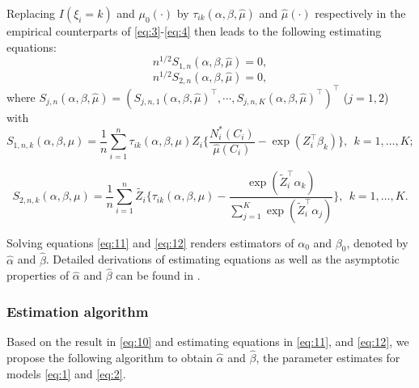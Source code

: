 Replacing \(I(\xi_i=k)\) and \(\mu_0(\cdot)\) by \(\tau_{ik}(\alpha, \beta, \hat\mu)\) and \(\hat\mu(\cdot)\) respectively in the empirical counterparts of \eqref{eq:3}-\eqref{eq:4} then leads to the following estimating equations:
\begin{equation} 
\label{eq:11}
n^{1/2} S_{1,n}(\alpha, \beta, \hat{\mu}) = 0,
\end{equation}
\begin{equation} 
\label{eq:12}
n^{1/2} S_{2,n}(\alpha, \beta, \hat{\mu}) = 0,
\end{equation}
where
\(S_{j,n} (\alpha, \beta, \hat{\mu}) = ( S_{j,n,1} (\alpha, \beta, \hat{\mu})^{\top}, \cdots , S_{j,n,K} (\alpha, \beta, \hat{\mu})^{\top} )^{\top}\)
(\(j = 1,2\))
with
\begin{equation}
S_{1,n,k}(\alpha, \beta, \mu) = \frac{1}{n}\sum _{i = 1} ^{n} \tau_{ik}(\alpha, \beta, \mu) Z_{i} \{ \frac{N_i ^{*} (C _{i})}{\hat\mu(C_{i})} - \exp(Z_{i} ^{\top} \beta_{k})\},\ \ k=1,\ldots, K;
\end{equation}

\begin{equation}
S_{2,n,k}(\alpha, \beta, \mu) = \frac{1}{n}\sum _{i = 1} ^{n}  \tilde{Z_{i}} \{ \tau_{ik}(\alpha, \beta, \mu) - \frac{\exp(\tilde{Z} _{i} ^{\top} \alpha _{k})}{\sum _{j = 1} ^{K} \exp(\tilde{Z} _{i} ^{\top} \alpha _{j})}\},\ \ k=1,\ldots, K.
\end{equation}

Solving equations \eqref{eq:11} and \eqref{eq:12} renders estimators of \(\alpha_0\) and \(\beta_0\), denoted by \(\hat\alpha\) and \(\hat\beta\). Detailed derivations of estimating equations as well as the asymptotic
properties of \(\hat\alpha\) and \(\hat\beta\) can be found in \citet{zhao2022semiparametric} .

\hypertarget{estimation-algorithm}{%
\subsubsection{Estimation algorithm}\label{estimation-algorithm}}

Based on the result in \eqref{eq:10} and estimating equations in \eqref{eq:11}, and \eqref{eq:12}, we propose the following algorithm to obtain \(\hat\alpha\) and \(\hat\beta\), the parameter estimates for models \eqref{eq:1} and \eqref{eq:2}.

